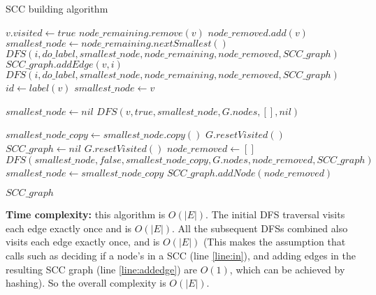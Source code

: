 \documentclass{article}
\begin{document}
\begin{description}
  \begin{algorithm}[H]
  \caption{SCC building algorithm}
  \label{alg:scc-graph}
    \begin{algorithmic}[1]
  
      \State $v.visited \gets true$
        \State $node\_remaining.remove(v)$
        \State $node\_removed.add(v)$
          \State $smallest\_node \gets node\_remaining.nextSmallest()$
        \EndIf
      \EndIf
          \State $DFS(i, do\_label, smallest\_node, node\_remaining, node\_removed, SCC\_graph)$
        \Else
          \label{line:in}
            \State $SCC\_graph.addEdge(v,i)$
            \label{line:addedge}
          \Else
            \State $DFS(i, do\_label, smallest\_node, node\_remaining, node\_removed, SCC\_graph)$
          \EndIf
        \EndIf
      \EndFor
        \State $id \gets label(v)$
          \State $smallest\_node \gets v$
        \EndIf
      \EndIf
    \EndFunction

      \State $smallest\_node \gets nil$
      \State $DFS(v, true, smallest\_node, G.nodes, [], nil)$

      \State $smallest\_node\_copy \gets smallest\_node.copy()$
      \State $G.resetVisited()$
      \State $SCC\_graph \gets nil$
        \State $G.resetVisited()$
        \State $node\_removed \gets []$
        \State $DFS(smallest\_node, false, smallest\_node\_copy, G.nodes, node\_removed, SCC\_graph)$
        \State $smallest\_node \gets smallest\_node\_copy$
        \State $SCC\_graph.addNode(node\_removed)$
      \EndWhile

      \State \Return $SCC\_graph$
    \EndFunction
    
    \end{algorithmic}
  \end{algorithm}

  \textbf{Time complexity:} this algorithm is $O(|E|)$. The initial DFS traversal visits each edge exactly once and is $O(|E|)$. All the subsequent DFSs combined also visits each edge exactly once, and is $O(|E|)$ (This makes the assumption that calls such as deciding if a node's in a SCC (line \ref{line:in}), and adding edges in the resulting SCC graph (line \ref{line:addedge}) are $O(1)$, which can be achieved by hashing). So the overall complexity is $O(|E|)$.


\end{description}
\end{document}
